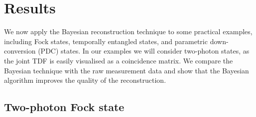 \documentclass[aps,pra,twocolumn,amsmath,amssymb,color,superscriptaddress]{revtex4}
\begin{document}
%
%

\section{Results}

We now apply the Bayesian reconstruction technique to some practical examples, including Fock states, temporally entangled states, and parametric down-conversion (PDC) states. In our examples we will consider two-photon states, as the joint TDF is easily visualised as a coincidence matrix. We compare the Bayesian technique with the raw measurement data and show that the Bayesian algorithm improves the quality of the reconstruction.

%
%

\subsection{Two-photon Fock state}
\end{document}
